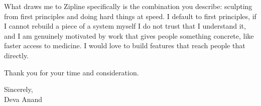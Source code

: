 \documentclass[letterpaper,11pt]{article}
\begin{document}
What draws me to Zipline specifically is the combination you describe: sculpting from first principles and doing hard things at speed. I default to first principles, if I cannot rebuild a piece of a system myself I do not trust that I understand it, and I am genuinely motivated by work that gives people something concrete, like faster access to medicine. I would love to build features that reach people that directly.

Thank you for your time and consideration.

\vspace{6pt}

Sincerely, \\
Deva Anand
\end{document}
